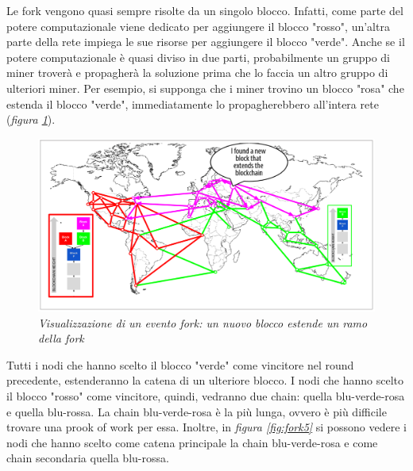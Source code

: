 Le fork vengono quasi sempre risolte da un singolo blocco. Infatti, come parte del potere computazionale viene dedicato per aggiungere il blocco "rosso", un'altra parte della rete impiega le sue risorse per aggiungere il blocco "verde". Anche se il potere computazionale è quasi diviso in due parti, probabilmente un gruppo di miner troverà e propagherà la soluzione prima che lo faccia un altro gruppo di ulteriori miner. Per esempio, si supponga che i miner trovino un blocco "rosa" che estenda il blocco "verde", immediatamente lo propagherebbero all'intera rete (\textit{figura \ref{fig:fork4}}).
\begin{figure}[htbp]
	\centering
	\includegraphics[width=0.85 \linewidth]{figure/fork4}
	\caption{\textit{Visualizzazione di un evento fork: un nuovo blocco estende un ramo della fork} \label{fig:fork4}}
\end{figure}

Tutti i nodi che hanno scelto il blocco "verde" come vincitore nel round precedente, estenderanno la catena di un ulteriore blocco. I nodi che hanno scelto il blocco "rosso" come vincitore, quindi, vedranno due chain: quella blu-verde-rosa e quella blu-rossa. La chain blu-verde-rosa è la più lunga, ovvero è più difficile trovare una prook of work per essa. Inoltre, in \textit{figura \ref{fig:fork5}} si possono vedere i nodi che hanno scelto come catena principale la chain blu-verde-rosa e come chain secondaria quella blu-rossa.

